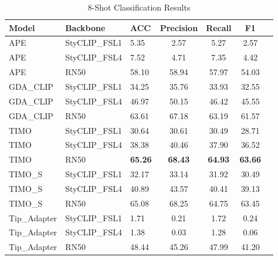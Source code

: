 \documentclass[conference,6pt]{IEEEtran}
\begin{document}
\begin{table}[H]
\centering
\tiny
\caption{8-Shot Classification Results}
\label{tab:results_8shot}
\begin{tabular}{@{}lll*{4}{S[table-format=2.2]}@{}}
\toprule
\textbf{Model} & \textbf{Backbone} & \textbf{ACC} & \textbf{Precision} & \textbf{Recall} & \textbf{F1} \\
\midrule
APE & StyCLIP\_FSL1 & 5.35 & 2.57 & 5.27 & 2.57 \\
APE & StyCLIP\_FSL4 & 7.52 & 4.71 & 7.35 & 4.42 \\
APE & RN50 & 58.10 & 58.94 & 57.97 & 54.03 \\
GDA\_CLIP & StyCLIP\_FSL1 & 34.25 & 35.76 & 33.93 & 32.55 \\
GDA\_CLIP & StyCLIP\_FSL4 & 46.97 & 50.15 & 46.42 & 45.55 \\
GDA\_CLIP & RN50 & 63.61 & 67.18 & 63.19 & 61.57 \\
TIMO & StyCLIP\_FSL1 & 30.64 & 30.61 & 30.49 & 28.71 \\
TIMO & StyCLIP\_FSL4 & 38.38 & 40.46 & 37.90 & 36.52 \\
TIMO & RN50 & \textbf{65.26} & \textbf{68.43} & \textbf{64.93} & \textbf{63.66} \\
TIMO\_S & StyCLIP\_FSL1 & 32.17 & 33.14 & 31.92 & 30.49 \\
TIMO\_S & StyCLIP\_FSL4 & 40.89 & 43.57 & 40.41 & 39.13 \\
TIMO\_S & RN50 & 65.08 & 68.25 & 64.75 & 63.45 \\
Tip\_Adapter & StyCLIP\_FSL1 & 1.71 & 0.21 & 1.72 & 0.24 \\
Tip\_Adapter & StyCLIP\_FSL4 & 1.38 & 0.03 & 1.28 & 0.06 \\
Tip\_Adapter & RN50 & 48.44 & 45.26 & 47.99 & 41.20 \\
\bottomrule
\end{tabular}
\end{table}
\end{document}
